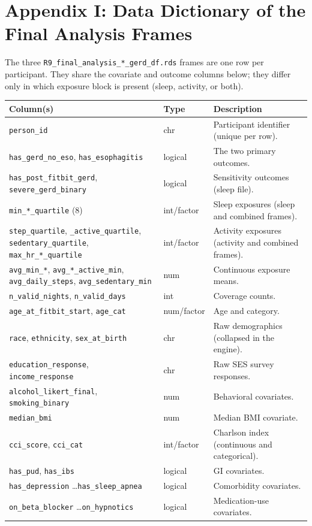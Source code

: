 \documentclass[11pt]{article}
\newcommand{\code}[1]{\texttt{\small #1}}
\begin{document}
\section{Appendix I: Data Dictionary of the Final Analysis Frames}
The three \code{R9_final_analysis_*_gerd_df.rds} frames are one row per participant. They share the
covariate and outcome columns below; they differ only in which exposure block is present (sleep,
activity, or both).

\begin{longtable}{@{}p{4.4cm}p{2.4cm}p{6.4cm}@{}}
\toprule
\textbf{Column(s)} & \textbf{Type} & \textbf{Description} \\
\midrule
\endhead
\code{person_id} & chr & Participant identifier (unique per row). \\
\code{has_gerd_no_eso}, \code{has_esophagitis} & logical & The two primary outcomes. \\
\code{has_post_fitbit_gerd}, \code{severe_gerd_binary} & logical & Sensitivity outcomes (sleep file). \\
\code{min_*_quartile} (8) & int/factor & Sleep exposures (sleep and combined frames). \\
\code{step_quartile}, \code{*_active_quartile}, \code{sedentary_quartile}, \code{max_hr_*_quartile} & int/factor & Activity exposures (activity and combined frames). \\
\code{avg_min_*}, \code{avg_*_active_min}, \code{avg_daily_steps}, \code{avg_sedentary_min} & num & Continuous exposure means. \\
\code{n_valid_nights}, \code{n_valid_days} & int & Coverage counts. \\
\code{age_at_fitbit_start}, \code{age_cat} & num/factor & Age and category. \\
\code{race}, \code{ethnicity}, \code{sex_at_birth} & chr & Raw demographics (collapsed in the engine). \\
\code{education_response}, \code{income_response} & chr & Raw SES survey responses. \\
\code{alcohol_likert_final}, \code{smoking_binary} & num & Behavioral covariates. \\
\code{median_bmi} & num & Median BMI covariate. \\
\code{cci_score}, \code{cci_cat} & int/factor & Charlson index (continuous and categorical). \\
\code{has_pud}, \code{has_ibs} & logical & GI covariates. \\
\code{has_depression} \ldots \code{has_sleep_apnea} & logical & Comorbidity covariates. \\
\code{on_beta_blocker} \ldots \code{on_hypnotics} & logical & Medication-use covariates. \\
\bottomrule
\end{longtable}
\end{document}
